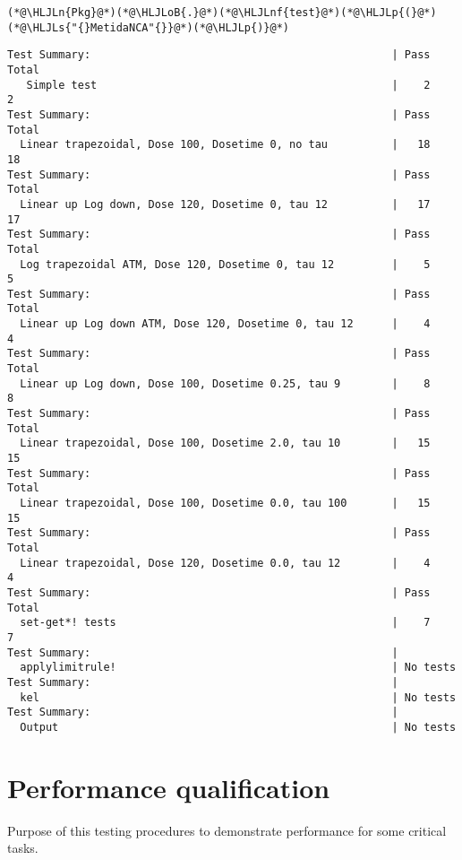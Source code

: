 \documentclass[12pt,a4paper]{article}
\newcommand{\HLJLn}[1]{#1}
\newcommand{\HLJLnf}[1]{\textcolor[RGB]{66,102,213}{#1}}
\newcommand{\HLJLs}[1]{\textcolor[RGB]{201,61,57}{#1}}
\newcommand{\HLJLoB}[1]{\textcolor[RGB]{102,102,102}{\textbf{#1}}}
\newcommand{\HLJLp}[1]{#1}
\begin{document}
\begin{lstlisting}
(*@\HLJLn{Pkg}@*)(*@\HLJLoB{.}@*)(*@\HLJLnf{test}@*)(*@\HLJLp{(}@*)(*@\HLJLs{"{}MetidaNCA"{}}@*)(*@\HLJLp{)}@*)
\end{lstlisting}

\begin{lstlisting}
Test Summary:                                               | Pass  Total
   Simple test                                              |    2      2
Test Summary:                                               | Pass  Total
  Linear trapezoidal, Dose 100, Dosetime 0, no tau          |   18     18
Test Summary:                                               | Pass  Total
  Linear up Log down, Dose 120, Dosetime 0, tau 12          |   17     17
Test Summary:                                               | Pass  Total
  Log trapezoidal ATM, Dose 120, Dosetime 0, tau 12         |    5      5
Test Summary:                                               | Pass  Total
  Linear up Log down ATM, Dose 120, Dosetime 0, tau 12      |    4      4
Test Summary:                                               | Pass  Total
  Linear up Log down, Dose 100, Dosetime 0.25, tau 9        |    8      8
Test Summary:                                               | Pass  Total
  Linear trapezoidal, Dose 100, Dosetime 2.0, tau 10        |   15     15
Test Summary:                                               | Pass  Total
  Linear trapezoidal, Dose 100, Dosetime 0.0, tau 100       |   15     15
Test Summary:                                               | Pass  Total
  Linear trapezoidal, Dose 120, Dosetime 0.0, tau 12        |    4      4
Test Summary:                                               | Pass  Total
  set-get*! tests                                           |    7      7
Test Summary:                                               |
  applylimitrule!                                           | No tests
Test Summary:                                               |
  kel                                                       | No tests
Test Summary:                                               |
  Output                                                    | No tests
\end{lstlisting}


\section{Performance qualification}
Purpose of this testing procedures to demonstrate performance for some critical tasks.
\end{document}
